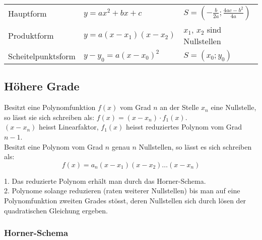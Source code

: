 \settowidth{\MyLenA}{Scheitelpunktsform~~}
\settowidth{\MyLenB}{$y = a(x - x_1)(x - x_2)$~~}
\begin{tabular}{@{}p{\the\MyLenA}%
				@{}p{\the\MyLenB}
				@{}p{\linewidth - \the\MyLenA - \the\MyLenB}}
Hauptform & $y = ax^2 + bx + c$ & $S = (-\frac{b}{2a}; \frac{4ac - b^2}{4a})$\\
Produktform & $y = a(x - x_1)(x - x_2)$ & $x_1$, $x_2$ sind Nullstellen\\
Scheitelpunktsform & $y - y_0 = a(x - x_0)^2$ & $S = (x_0;y_0)$\\
\end{tabular}

\subsection{Höhere Grade}
Besitzt eine Polynomfunktion $f(x)$ vom Grad $n$ an der Stelle $x_n$ eine Nullstelle,
so lässt sie sich schreiben als: $f(x) = (x - x_n) \cdot f_1(x)$.\\
$(x - x_n)$ heisst Linearfaktor, $f_1(x)$ heisst reduziertes Polynom vom Grad $n - 1$.\\
Besitzt eine Polynom vom Grad $n$ genau $n$ Nullstellen, so lässt es sich schreiben als:
\begin{equation*}
	f(x) = a_n(x - x_1)(x - x_2) \dots (x - x_n)
\end{equation*}

1. Das reduzierte Polynom erhält man durch das Horner-Schema.\\
2. Polynome solange reduzieren (raten weiterer Nullstellen) bis man auf eine Polynomfunktion zweiten Grades stösst, 
deren Nullstellen sich durch lösen der quadratischen Gleichung ergeben.

\subsubsection{Horner-Schema}

